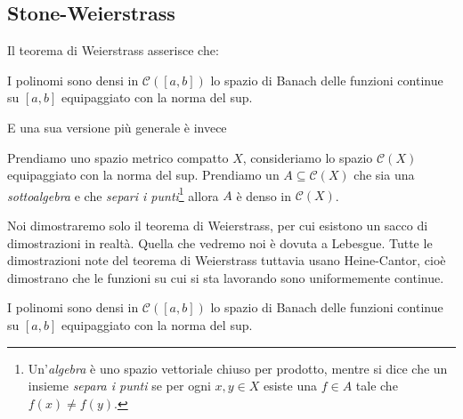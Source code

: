 \documentclass[11pt]{scrartcl}
\begin{document}
	\subsection{Stone-Weierstrass}
	
	Il teorema di Weierstrass asserisce che:
	\begin{theorem*}[Weierstrass]
		I polinomi sono densi in $\mathcal{C}([a,b])$ lo spazio di Banach delle funzioni continue su $[a,b]$ equipaggiato con la norma del sup.
	\end{theorem*}
	E una sua versione più generale è invece
	\begin{theorem}
		Prendiamo uno spazio metrico compatto $X$, consideriamo lo spazio $\mathcal{C}(X)$ equipaggiato con la norma del sup. Prendiamo un $A\subseteq \mathcal{C}(X)$ che sia una \textit{sottoalgebra} e che \textit{separi i punti}\footnote{Un'\textit{algebra} è uno spazio vettoriale chiuso per prodotto, mentre si dice che un insieme \textit{separa i punti} se per ogni $x,y\in X$ esiste una $f\in A$ tale che $f(x)\ne f(y)$.} allora $A$ è denso in $\mathcal{C}(X)$.
	\end{theorem}
	Noi dimostraremo solo il teorema di Weierstrass, per cui esistono un sacco di dimostrazioni in realtà. Quella che vedremo noi è dovuta a Lebesgue. Tutte le dimostrazioni note del teorema di Weierstrass tuttavia usano Heine-Cantor, cioè dimostrano che le funzioni su cui si sta lavorando sono uniformemente continue.
	\begin{theorem}[Weierstrass]
		I polinomi sono densi in $\mathcal{C}([a,b])$ lo spazio di Banach delle funzioni continue su $[a,b]$ equipaggiato con la norma del sup.
	\end{theorem}
\end{document}
